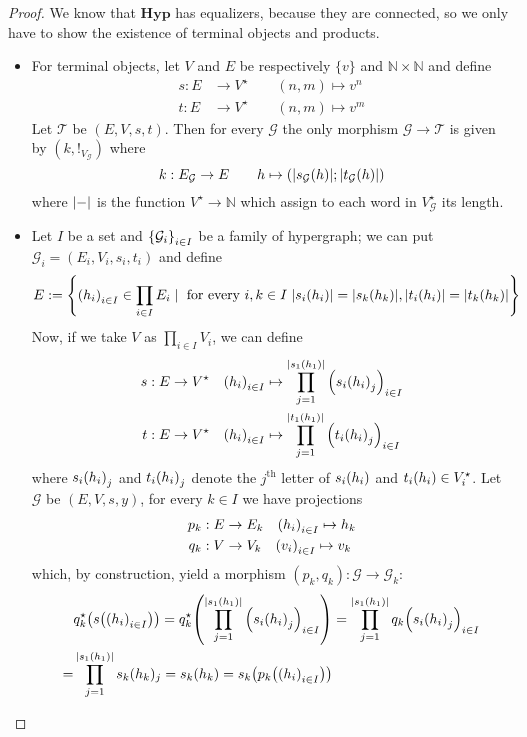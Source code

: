 \documentclass[runningheads,envcountsect]{lmcs}
\newcommand{\hyp}{\catname{Hyp}}
\newcommand{\catname}[1]{\mathbf{#1}}
\theoremstyle{plain}
\theoremstyle{definition}
\begin{document}
\begin{proof}
	We know that $\hyp$ has equalizers, because they are connected, so we only have to show the existence of terminal objects and products.
	\begin{itemize}
		\item For terminal objects, let $V$ and $E$ be respectively $\{v\}$ and $\mathbb{N}\times \mathbb{N}$ and define 
		\begin{align*}
		s:E&\to V^\star\qquad (n,m)\mapsto v^n\\
		t:E&\to V^\star\qquad (n,m)\mapsto v^m
		\end{align*}
		Let $\mathcal{T}$ be $(E,V, s,t)$. Then for every $\mathcal{G}$ the only  morphism $\mathcal{G}\to \mathcal{T}$ is given by $(k,!_{V_\mathcal{G}})$ where
		\[k:E_{\mathcal{G}}\to E \qquad h\mapsto (\abs{s_{\mathcal{G}}(h)}; \abs{t_{\mathcal{G}}(h)}) \]
		where $\abs{-}$ is the function $V^{\star}\to \mathbb{N}$ which assign to each word in $V_\mathcal{G}^\star$ its length.
		\item Let $I$ be a set and $\qty{\mathcal{G}_i}_{i\in I}$ be a family of hypergraph; we can put $\mathcal{G}_i=(E_i, V_i, s_i, t_i)$  and define 
		\begin{align*}
		E&:=\qty{\qty(h_i)_{i\in I}\in \prod_{i\in I}E_{i} \mid \text{ for every } i, k\in I \hspace{3pt} \abs{s_{i}\qty(h_i)}=\abs{s_k\qty(h_k)}, \abs{t_{i}\qty(h_i)}=\abs{t_{k}\qty(h_k)}}\end{align*}
		Now, if we take $V$ as $\prod_{i\in I}V_{i}$, we can define
		\begin{align*}
		s&:E\to V^{\star} \quad \qty(h_i)_{i\in I} \mapsto \prod_{j=1}^{\abs{s_1\qty(h_1)}}\qty(s_i\qty(h_i)_j)_{i\in I}\\
		t&:E\to V^{\star} \quad \qty(h_i)_{i\in I} \mapsto \prod_{j=1}^{\abs{t_1\qty(h_1)}}\qty(t_i\qty(h_i)_j)_{i\in I}
		\end{align*}
		where $s_i\qty(h_i)_j$ and $t_i\qty(h_i)_j$ denote the $j^{\mathrm{th}}$ letter of $s_i\qty(h_i)$ and $t_i\qty(h_i)\in V_{i}^\star$. Let $\mathcal{G}$ be $(E, V, s, y)$, for every $k\in I$ we have projections
		\begin{align*}p_k&:E\to E_k \quad \qty(h_i)_{i\in I} \mapsto h_k\\
		q_k&:V\to V_k \quad \qty(v_i)_{i\in I}\mapsto v_k
		\end{align*}  
		which, by construction, yield a morphism $(p_k, q_k):\mathcal{G}\to\mathcal{G}_k$: 
		\begin{align*}
		&q^{\star}_k\qty(s\qty(\qty(h_i)_{i\in I}))=q^\star_k\qty(\prod_{j=1}^{\abs{s_1\qty(h_1)}}\qty(s_i\qty(h_i)_j)_{i\in I})=\prod_{j=1}^{\abs{s_1\qty(h_1)}}q_k\qty(s_i\qty(h_i)_j)_{i\in I}\\=&\prod_{j=1}^{\abs{s_1\qty(h_1)}}s_k(h_k)_j=s_k\qty(h_k)=s_k\qty(p_k\qty(\qty(h_i)_{i\in I}))\\

\end{align*}
\end{itemize}
\end{proof}
\end{document}

